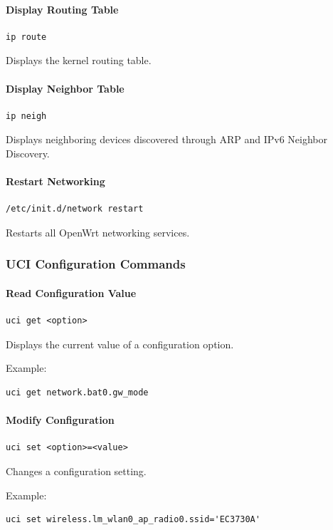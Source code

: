 \documentclass[conference]{IEEEtran}
\begin{document}
\paragraph{Display Routing Table}
\begin{verbatim}
ip route
\end{verbatim}
Displays the kernel routing table.

\paragraph{Display Neighbor Table}
\begin{verbatim}
ip neigh
\end{verbatim}
Displays neighboring devices discovered through ARP and IPv6 Neighbor Discovery.

\paragraph{Restart Networking}
\begin{verbatim}
/etc/init.d/network restart
\end{verbatim}
Restarts all OpenWrt networking services.

\subsubsection{UCI Configuration Commands}

\paragraph{Read Configuration Value}
\begin{verbatim}
uci get <option>
\end{verbatim}
Displays the current value of a configuration option.

Example:
\begin{verbatim}
uci get network.bat0.gw_mode
\end{verbatim}

\paragraph{Modify Configuration}
\begin{verbatim}
uci set <option>=<value>
\end{verbatim}
Changes a configuration setting.

Example:
\begin{verbatim}
uci set wireless.lm_wlan0_ap_radio0.ssid='EC3730A'
\end{verbatim}
\end{document}
